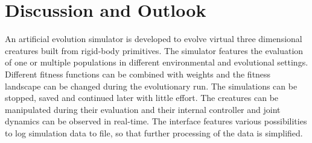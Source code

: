 \documentclass[main]{subfiles}
\begin{document}
\setcounter{chapter}{4}

\chapter{Discussion and Outlook} %

\label{Chapter\thechapter} %

%
An artificial evolution simulator is developed to evolve virtual three dimensional creatures built from rigid-body primitives. %
%
The simulator features the evaluation of one or multiple populations in different environmental and evolutional settings. %
%
Different fitness functions can be combined with weights and the fitness landscape can be changed during the evolutionary run. %
%
The simulations can be stopped, saved and continued later with little effort. %
%
The creatures can be manipulated during their evaluation and their internal controller and joint dynamics can be observed in real-time. %
%
The interface features various possibilities to log simulation data to file, so that further processing of the data is simplified. 
\end{document}
